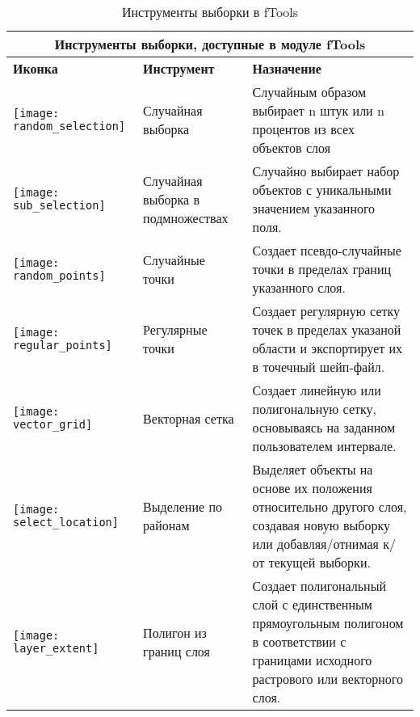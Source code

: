 \begin{table}[ht]
\centering
 \begin{tabular}{|m{1cm}|m{3cm}|m{9cm}|}
 \hline \multicolumn{3}{|c|}{\textbf{Инструменты выборки, доступные в  модуле fTools}} \\
 \hline \textbf{Иконка} & \textbf{Инструмент} & \textbf{Назначение} \\
 \hline \texttt{[image: random\_selection]} & Случайная выборка & Случайным
 образом выбирает n штук или n процентов из всех объектов слоя \\
 \hline \texttt{[image: sub\_selection]} & Случайная выборка
 в подмножествах & Случайно выбирает набор объектов с уникальными значением указанного поля. \\
 \hline \texttt{[image: random\_points]} & Случайные точки & Создает
 псевдо-случайные точки в пределах границ указанного слоя. \\
 \hline \texttt{[image: regular\_points]} & Регулярные точки & Создает
 регулярную сетку точек в пределах указаной области и экспортирует их в точечный шейп-файл. \\
 \hline \texttt{[image: vector\_grid]} & Векторная сетка & Создает
 линейную или полигональную сетку, основываясь на заданном пользователем интервале. \\
 \hline \texttt{[image: select\_location]} & Выделение по районам &
 Выделяет объекты на основе их положения относительно другого слоя, создавая новую
 выборку или добавляя/отнимая к/от текущей выборки. \\
 \hline \texttt{[image: layer\_extent]} & Полигон из границ слоя &
 Создает полигональный слой с единственным прямоугольным полигоном в соответствии
 с границами исходного растрового или векторного слоя. \\
 \hline
\end{tabular}
\caption{Инструменты выборки в fTools}\label{tab:ftool_research}
\end{table}

